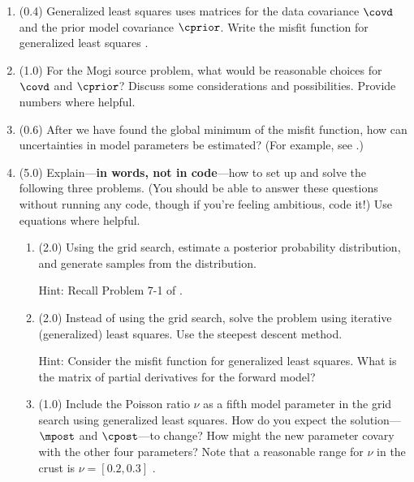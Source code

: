 \documentclass[11pt,titlepage,fleqn]{article}
\begin{document}
\begin{enumerate}
\item (0.4) Generalized least squares uses matrices for the data covariance $\covd$ and the prior model covariance $\cprior$. Write the misfit function for generalized least squares \citep{Tarantola2005}.

\item (1.0)
For the Mogi source problem, what would be reasonable choices for $\covd$ and $\cprior$? Discuss some considerations and possibilities. Provide numbers where helpful.

\item (0.6) After we have found the global minimum of the misfit function, how can uncertainties in model parameters be estimated? (For example, see \citet{Wright2003}.)


\item (5.0) Explain---{\bf in words, not in code}---how to set up and solve the following three problems.
(You should be able to answer these questions without running any code, though if you're feeling ambitious, code it!) Use equations where helpful.

\begin{enumerate}
\item (2.0) Using the grid search, estimate a posterior probability distribution, and generate samples from the distribution.

Hint: Recall Problem 7-1 of \citet{Tarantola2005}.

\item (2.0) Instead of using the grid search, solve the problem using iterative (generalized) least squares. Use the steepest descent method.

Hint: Consider the misfit function for generalized least squares. What is the matrix of partial derivatives for the forward model?

\item (1.0) Include the Poisson ratio $\nu$ as a fifth model parameter in the grid search using generalized least squares. How do you expect the solution---$\mpost$ and $\cpost$---to change? How might the new parameter covary with the other four parameters? Note that a reasonable range for $\nu$ in the crust is $\nu = [0.2,0.3]$ \citep{ChristensenMooney1995}.

\end{enumerate}

\end{enumerate}

\pagebreak



\end{document}
